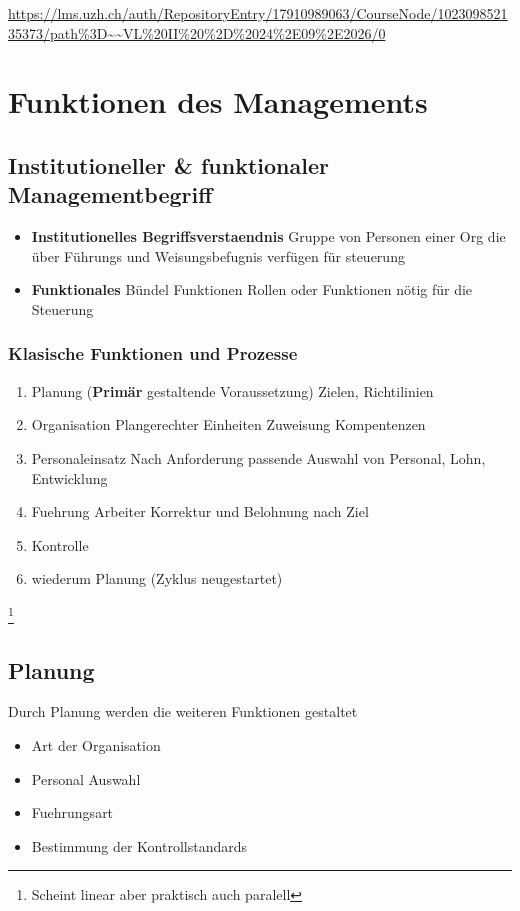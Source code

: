 \pagebreak
{}
\url{https://lms.uzh.ch/auth/RepositoryEntry/17910989063/CourseNode/102309852135373/path%3D~~VL%20II%20%2D%2024%2E09%2E2026/0}
\section{Funktionen des Managements}
\subsection{Institutioneller \& funktionaler Managementbegriff}
\begin{itemize}
    \item \textbf{Institutionelles Begriffsverstaendnis}
    \subitem Gruppe von Personen einer Org die über Führungs und Weisungsbefugnis verfügen
    \subitem für steuerung 
    \item \textbf{Funktionales}
    \subitem Bündel Funktionen
    \subitem Rollen oder Funktionen nötig für die Steuerung  
\end{itemize}

\subsubsection{Klasische Funktionen und Prozesse}
\begin{enumerate}
    \item Planung (\textbf{Primär} gestaltende Voraussetzung) 
    \subitem Zielen, Richtilinien
    \item Organisation
    \subitem  Plangerechter Einheiten
    \subitem Zuweisung Kompentenzen
    \item Personaleinsatz
        \subitem Nach Anforderung passende Auswahl von Personal, Lohn, Entwicklung 
    \item Fuehrung
        \subitem Arbeiter Korrektur und Belohnung nach Ziel 
    \item Kontrolle
    \item wiederum Planung (Zyklus neugestartet)
\end{enumerate}
\footnote{Scheint linear aber praktisch auch paralell }
\pagebreak
\subsection{Planung}
Durch Planung werden die weiteren Funktionen gestaltet
\begin{itemize}
    \item Art der Organisation
    \item Personal Auswahl
    \item Fuehrungsart
    \item Bestimmung der Kontrollstandards
\end{itemize}


